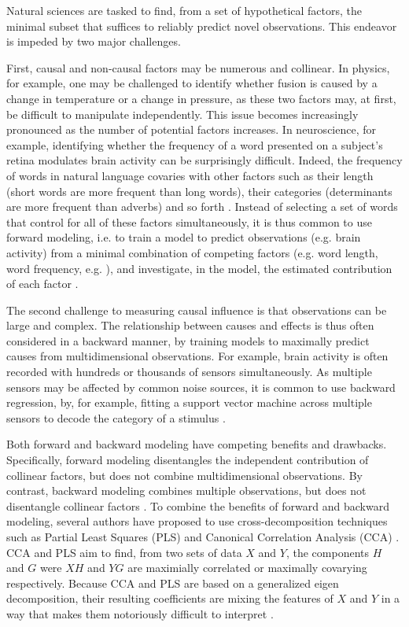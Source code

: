 Natural sciences are tasked to find, from a set of hypothetical factors, the minimal subset that suffices to reliably predict novel observations. This endeavor is impeded by two major challenges.

First, causal and non-causal factors may be numerous and collinear. In physics, for example, one may be challenged to identify whether fusion is caused by a change in temperature or a change in pressure, as these two factors may, at first, be difficult to manipulate independently. This issue becomes increasingly pronounced as the number of potential factors increases. In neuroscience, for example, identifying whether the frequency of a word presented on a subject's retina modulates brain activity can be surprisingly difficult. Indeed, the frequency of words in natural language covaries with other factors such as their length (short words are more frequent than long words), their categories (determinants are more frequent than adverbs) and so forth \citep{kutas2011thirty,pegado2014timing}. Instead of selecting a set of words that control for all of these factors simultaneously, it is thus common to use forward modeling, i.e. to train a model to predict observations (e.g. brain activity) from a minimal combination of competing factors (e.g. word length, word frequency, e.g. \citep{huth2016natural}), and investigate, in the model, the estimated contribution of each factor \citep{friston1994statistical}.

The second challenge to measuring causal influence is that observations can be large and complex. The relationship between causes and effects is thus often considered in a backward manner, by training models to maximally predict causes from multidimensional observations. For example, brain activity is often recorded with hundreds or thousands of sensors simultaneously. As multiple sensors may be affected by common noise sources, it is common to use backward regression, by, for example, fitting a support vector machine across multiple sensors to decode the category of a stimulus \citep{cichy2014resolving,  kriegeskorte2008representational, norman2006beyond}.

Both forward and backward modeling have competing benefits and drawbacks. Specifically, forward modeling disentangles the independent contribution of collinear factors, but does not combine multidimensional observations. By contrast, backward modeling combines multiple observations, but does not disentangle collinear factors \citep{weichwald2015causal, hebart2018deconstructing, king2018encoding}. To combine the benefits of forward and backward modeling, several authors have proposed to use cross-decomposition techniques such as Partial Least Squares (PLS) and Canonical Correlation Analysis (CCA) \citep{de2019multiway}.
CCA and PLS aim to find, from two sets of data $X$ and $Y$, the components $H$ and $G$ were $XH$ and $YG$ are maximially correlated or maximally covarying respectively. Because CCA and PLS are based on a generalized eigen decomposition, their resulting coefficients are mixing the features of $X$ and $Y$ in a way that makes them notoriously difficult to interpret \citep{lebart1995statistique}.

